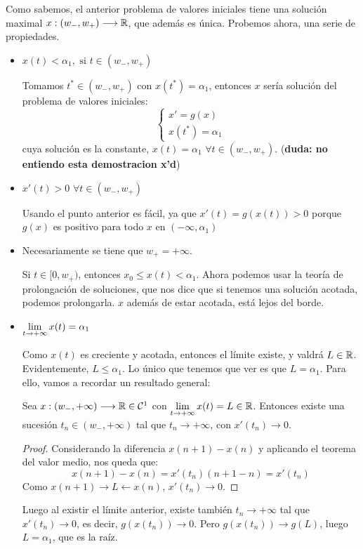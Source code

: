 \begin{example}
Como sabemos, el anterior problema de valores iniciales tiene una solución maximal $x : (w_-,w_+) \longrightarrow \mathbb{R}$, que además es única. Probemos ahora, una serie de propiedades.
\begin{itemize}
\item $x(t)<\alpha_1, \text{ si } t\in(w_-,w_+)$

Tomamos $t^*\in(w_-,w_+)$ con $x(t^*)=\alpha_1$, entonces $x$ sería solución del problema de valores iniciales:
\[
\left\{
\begin{array}{l}
x'=g(x) \\
x(t^*)=\alpha_1
\end{array}
\right.
\]
cuya solución es la constante, $x(t)=\alpha_1$ $\forall t\in(w_-,w_+)$. (\textbf{duda: no entiendo esta demostracion x'd})

\item $x'(t)>0$ $\forall t\in(w_-,w_+)$

Usando el punto anterior es fácil, ya que $x'(t)=g(x(t))>0$ porque $g(x)$ es positivo para todo $x$ en $(-\infty, \alpha_1)$

\item Necesariamente se tiene que $w_+=+\infty$.

Si $t\in[0,w_+)$, entonces $x_0\leq x(t) < \alpha_1$. Ahora podemos usar la teoría de prolongación de soluciones, que nos dice que si tenemos una solución acotada, podemos prolongarla. $x$ además de estar acotada, está lejos del borde. 

\item $\displaystyle\lim_{  t  \to +\infty }  x(t) =\alpha_1$

Como $x(t)$ es creciente y acotada, entonces el límite existe, y valdrá $L\in\mathbb{R}$. Evidentemente, $L\leq \alpha_1$. Lo único que tenemos que ver es que $L=\alpha_1$. Para ello, vamos a recordar un resultado general:
\begin{lemma}
Sea $x : (w_-,+\infty) \longrightarrow \mathbb{R}\in\mathcal{C}^1$ con $\displaystyle\lim_{  t  \to +\infty }  x(t) =L\in\mathbb{R}$. Entonces existe una sucesión $t_n\in(w_-,+\infty)$ tal que $t_n\longrightarrow +\infty$, con $x'(t_n)\longrightarrow 0$.
\end{lemma}
\begin{proof}
Considerando la diferencia $x(n+1)-x(n)$ y aplicando el teorema del valor medio, nos queda que:
\[
x(n+1)-x(n)=x'(t_n)(n+1-n)=x'(t_n)
\]
Como $x(n+1)\longrightarrow L \leftarrow x(n)$, $x'(t_n)\longrightarrow 0$.
\end{proof}
Luego al existir el límite anterior, existe también $t_n\longrightarrow +\infty$ tal que $x'(t_n)\longrightarrow 0$, es decir, $g(x(t_n))\longrightarrow 0$.  Pero $g(x(t_n))\longrightarrow g(L)$, luego $L=\alpha_1$, que es la raíz.
\end{itemize}


\end{example}

